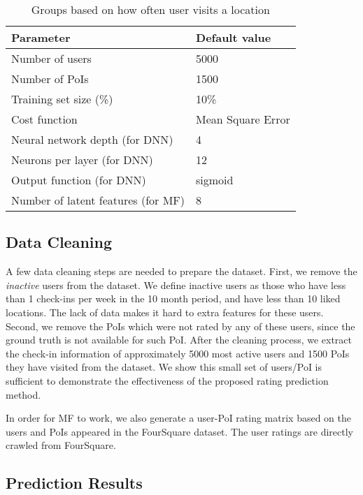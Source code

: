 \begin{table}[htbp]
\begin{center}
\caption{Groups based on how often user visits a location \label{settings}}
\begin{tabular}{|l|l|} \hline
\textbf{Parameter} & \textbf{Default value} \\ \hline
Number of users & 5000  \\ \hline
Number of PoIs & 1500 \\ \hline
Training set size (\%) & 10\% \\ \hline
Cost function & Mean Square Error \\ \hline
Neural network depth (for DNN)& 4 \\ \hline
Neurons per layer (for DNN) & 12 \\ \hline
Output function (for DNN) & sigmoid \\ \hline
Number of latent features (for MF) & 8 \\ \hline
\end{tabular}
\end{center}
\end{table}

\subsection{Data Cleaning}

A few data cleaning steps are needed to prepare the dataset. First, we remove the \textit{inactive} users from the dataset. We define inactive users as those who have less than 1 check-ins per week in the 10 month period, and have less than 10 liked locations. The lack of data makes it hard to extra features for these users. Second, we remove the PoIs which were not rated by any of these users, since the ground truth is not available for such PoI. After the cleaning process, we extract the check-in information of approximately 5000 most active users and 1500 PoIs they have visited from the dataset. We show this small set of users/PoI is sufficient to demonstrate the effectiveness of the proposed rating prediction method.

In order for MF to work, we also generate a user-PoI rating matrix based on the users and PoIs appeared in the FourSquare dataset. The user ratings are directly crawled from FourSquare.


\subsection{Prediction Results}

